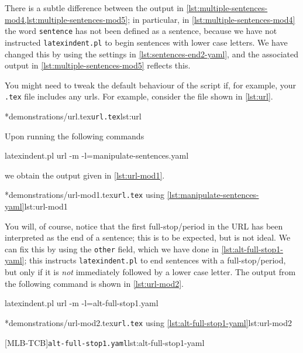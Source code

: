 	There is a subtle difference between the output in \cref{lst:multiple-sentences-mod4,lst:multiple-sentences-mod5}; in particular, in \cref{lst:multiple-sentences-mod4} the word \texttt{sentence} has not been defined as a sentence, because we have not instructed \texttt{latexindent.pl} to begin sentences with lower case letters.
	We have changed this by using the settings in \cref{lst:sentences-end2-yaml}, and the associated output in \cref{lst:multiple-sentences-mod5} reflects this.

	You might need to tweak the default behaviour of the script if, for example, your \texttt{.tex} file includes any urls.
	For example, consider the file shown in \cref{lst:url}.

	\cmhlistingsfromfile*[showspaces=false]*{demonstrations/url.tex}{\texttt{url.tex}}{lst:url}

	Upon running the following commands \begin{commandshell}
latexindent.pl url -m -l=manipulate-sentences.yaml
\end{commandshell} we obtain the output given in \cref{lst:url-mod1}.

	\cmhlistingsfromfile*[showspaces=false]*{demonstrations/url-mod1.tex}{\texttt{url.tex} using \vref{lst:manipulate-sentences-yaml}}{lst:url-mod1}

	You will, of course, notice that the first full-stop/period in the URL has been interpreted as the end of a sentence; this is to be expected, but is not ideal.
	We can fix this by using the \texttt{other} field, which we have done in \cref{lst:alt-full-stop1-yaml}; this instructs \texttt{latexindent.pl} to end sentences with a full-stop/period, but only if it is \emph{not} immediately followed by a lower case letter.
	The output from the following command is shown in \cref{lst:url-mod2}.
	\begin{commandshell}
latexindent.pl url -m -l=alt-full-stop1.yaml
\end{commandshell}

	\begin{adjustwidth}{-3.5cm}{-1.5cm}
		\begin{minipage}{.6\linewidth}
			\cmhlistingsfromfile*[showspaces=false]*{demonstrations/url-mod2.tex}{\texttt{url.tex} using \cref{lst:alt-full-stop1-yaml}}{lst:url-mod2}
		\end{minipage}
		\hfill
		\begin{minipage}{.4\linewidth}
			{\texttt{alt-full-stop1.yaml}}{lst:alt-full-stop1-yaml}
		\end{minipage}
	\end{adjustwidth}

